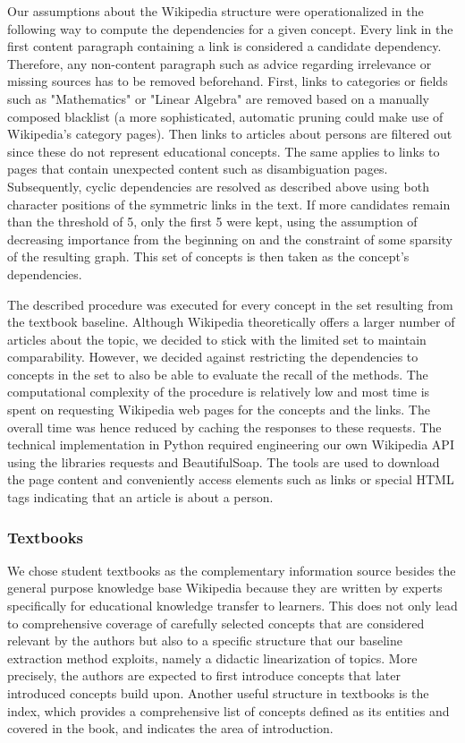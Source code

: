 \documentclass{article}
\begin{document}
Our assumptions about the Wikipedia structure were operationalized in the following way to compute the dependencies for a given concept. Every link in the first content paragraph containing a link is considered a candidate dependency. Therefore, any non-content paragraph such as advice regarding irrelevance or missing sources has to be removed beforehand. First, links to categories or fields such as "Mathematics" or "Linear Algebra" are removed based on a manually composed blacklist (a more sophisticated, automatic pruning could make use of Wikipedia's category pages). Then links to articles about persons are filtered out since these do not represent educational concepts. The same applies to links to pages that contain unexpected content such as disambiguation pages. Subsequently, cyclic dependencies are resolved as described above using both character positions of the symmetric links in the text. If more candidates remain than the threshold of 5, only the first 5 were kept, using the assumption of decreasing importance from the beginning on and the constraint of some sparsity of the resulting graph. This set of concepts is then taken as the concept's dependencies. 

The described procedure was executed for every concept in the set resulting from the textbook baseline. Although Wikipedia theoretically offers a larger number of articles about the topic, we decided to stick with the limited set to maintain comparability. However, we decided against restricting the dependencies to concepts in the set to also be able to evaluate the recall of the methods.
The computational complexity of the procedure is relatively low and most time is spent on requesting Wikipedia web pages for the concepts and the links. The overall time was hence reduced by caching the responses to these requests. The technical implementation in Python required engineering our own Wikipedia API using the libraries requests and BeautifulSoap. The tools are used to download the page content and conveniently access elements such as links or special HTML tags indicating that an article is about a person.

\subsubsection{Textbooks}
We chose student textbooks as the complementary information source besides the general purpose knowledge base Wikipedia because they are written by experts specifically for educational knowledge transfer to learners. This does not only lead to comprehensive coverage of carefully selected concepts that are considered relevant by the authors but also to a specific structure that our baseline extraction method exploits, namely a didactic linearization of topics. More precisely, the authors are expected to first introduce concepts that later introduced concepts build upon. Another useful structure in textbooks is the index, which provides a comprehensive list of concepts defined as its entities and covered in the book, and indicates the area of introduction.
\end{document}
